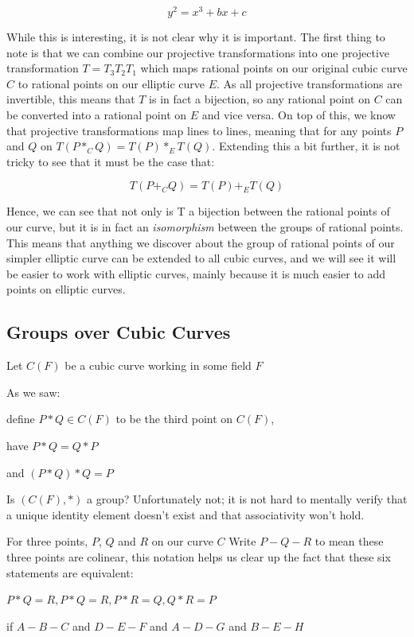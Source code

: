 \documentclass{article}
\begin{document}
\[y^2 = x^3 + bx + c\]

While this is interesting, it is not clear why it is important. The first thing to note is that we can combine our projective transformations into one  projective transformation $T = T_3 T_2 T_1$ which maps rational points on our original cubic curve $C$ to rational points on our elliptic curve $E$. As all projective transformations are invertible, this means that $T$ is in fact a bijection, so any rational point on $C$ can be converted into a rational point on $E$ and vice versa. On top of this, we know that projective transformations map lines to lines, meaning that for any points $P$ and $Q$ on $T(P *_C Q) = T(P) *_E T(Q)$. Extending this a bit further, it is not tricky to see that it must be the case that:

\[T(P +_C Q) = T(P) +_E T(Q)\]

Hence, we can see that not only is T a bijection between the rational points of our curve, but it is in fact an \emph{isomorphism} between the groups of rational points. This means that anything we discover about the group of rational points of our simpler elliptic curve can be extended to all cubic curves, and we will see it will be easier to work with elliptic curves, mainly because it is much easier to add points on elliptic curves.

\subsection{Groups over Cubic Curves}

Let $C(F)$ be a cubic curve working in some field $F$

As we saw:

define $P * Q \in C(F)$ to be the third point on $C(F)$,

have $P * Q = Q * P$

and $(P * Q) * Q = P$

Is $(C(F), *)$ a group? Unfortunately not; it is not hard to mentally verify that a unique identity element doesn't exist and that associativity won't hold.

For three points, $P$, $Q$ and $R$ on our curve $C$ Write $P - Q - R$ to mean these three points are colinear, this notation helps us clear up the fact that these six statements are equivalent:

$P * Q = R, P * Q = R, P * R = Q,  Q * R = P$

if $A - B - C$ and $D - E - F$ and $A - D - G$ and $B - E - H$
\end{document}
